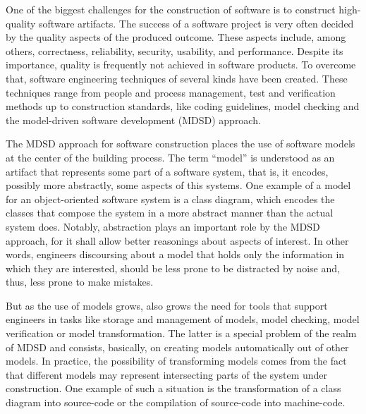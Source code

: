 
One of the biggest challenges for the construction of software is to construct high-quality software artifacts. The success of a software project is very often decided by the quality aspects of the produced outcome. These aspects include, among others, correctness, reliability, security, usability, and performance. Despite its importance, quality is frequently not achieved in software products. To overcome that, software engineering techniques of several kinds have been created. These techniques range from people and process management, test and verification methods up to construction standards, like coding guidelines, model checking and the model-driven software development (MDSD) approach.

The MDSD approach for software construction places the use of software models at the center of the building process. The term ``model'' is understood as an artifact that represents some part of a software system, that is, it encodes, possibly more abstractly, some aspects of this systems. One example of a model for an object-oriented software system is a class diagram, which encodes the classes that compose the system in a more abstract manner than the actual system does. Notably, abstraction plays an important role by the MDSD approach, for it shall allow better reasonings about aspects of interest. In other words, engineers discoursing about a model that holds only the information in which they are interested, should be less prone to be distracted by noise and, thus, less prone to make mistakes.

But as the use of models grows, also grows the need for tools that support engineers in tasks like storage and management of models, model checking, model verification or model transformation. The latter is a special problem of the realm of MDSD and consists, basically, on creating models automatically out of other models. In practice, the possibility of transforming models comes from the fact that different models may represent intersecting parts of the system under construction. One example of such a situation is the transformation of a class diagram into source-code or the compilation of source-code into machine-code.

